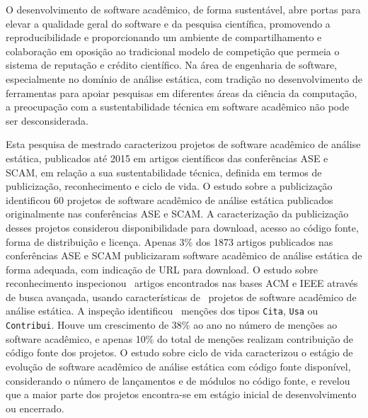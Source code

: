\label{conclusoes}


O desenvolvimento de software acadêmico, de forma sustentável,
abre portas para elevar a qualidade geral do software e
da pesquisa científica, promovendo a reproducibilidade e
proporcionando um ambiente de compartilhamento e colaboração 
em oposição ao tradicional modelo de competição que permeia
o sistema de reputação e crédito científico.
%
Na área de engenharia de software, 
especialmente no domínio de análise estática,
com tradição no desenvolvimento de ferramentas para apoiar pesquisas
em diferentes áreas da ciência da computação,
a preocupação com a sustentabilidade técnica em software acadêmico
não pode ser desconsiderada. 

Esta pesquisa de mestrado caracterizou
projetos de software acadêmico de análise estática,
publicados até 2015 em artigos científicos das conferências ASE e SCAM,
em relação a sua sustentabilidade técnica, definida
em termos de publicização, reconhecimento e ciclo de vida.
%
O estudo sobre a publicização
identificou 60 projetos de software acadêmico de análise estática
publicados originalmente nas conferências ASE e SCAM.
A caracterização da publicização desses projetos considerou
disponibilidade para download, acesso ao código fonte, forma de distribuição e licença.
Apenas 3\% dos 1873 artigos publicados nas conferências ASE e SCAM 
publicizaram software acadêmico de análise estática de forma adequada,
com indicação de URL para download.
%
O estudo sobre reconhecimento 
inspecionou \SearchUniqueCount \ artigos encontrados nas bases ACM
e IEEE através de busca avançada, 
usando características de \SoftwareCount \ projetos 
de software acadêmico de análise estática. 
A inspeção identificou  \ScreeningCount \ menções 
dos tipos \texttt{Cita}, \texttt{Usa} ou \texttt{Contribui}.
Houve um crescimento de 38\% ao ano no número de menções ao software acadêmico, 
e apenas 10\% do total de menções realizam contribuição de código fonte dos
projetos.
%
O estudo sobre ciclo de vida
caracterizou o estágio de evolução de software acadêmico de análise estática
com código fonte disponível,
considerando o número de lançamentos e de módulos no código fonte,
e revelou que a maior parte dos projetos encontra-se 
em estágio inicial de desenvolvimento ou encerrado.

